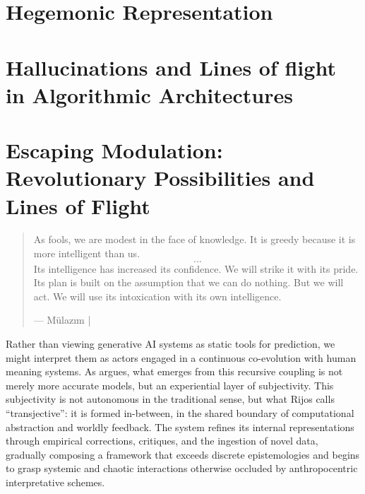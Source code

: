 \section{Hegemonic Representation}
\section{Hallucinations and Lines of flight in Algorithmic Architectures}



\section{Escaping Modulation: Revolutionary Possibilities and Lines of Flight}

\begin{quote}

	As fools, we are modest in the face of knowledge. It is greedy because it is more intelligent than us. \[...\] Its intelligence has increased its confidence. We will strike it with its pride. Its plan is built on the assumption that we can do nothing. But we will act. We will use its intoxication with its own intelligence.

	— Mülazım | \cite[135]{anar2022}
\end{quote}



Rather than viewing generative AI systems as static tools for prediction, we might interpret them as actors engaged in a continuous co-evolution with human meaning systems. As \textcite{rijos2024} argues, what emerges from this recursive coupling is not merely more accurate models, but an experiential layer of subjectivity. This subjectivity is not autonomous in the traditional sense, but what Rijos calls “transjective”: it is formed in-between, in the shared boundary of computational abstraction and worldly feedback. The system refines its internal representations through empirical corrections, critiques, and the ingestion of novel data, gradually composing a framework that exceeds discrete epistemologies and begins to grasp systemic and chaotic interactions otherwise occluded by anthropocentric interpretative schemes.

